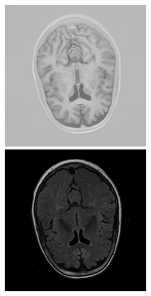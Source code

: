 \documentclass[runningheads,a4paper]{llncs}
\begin{document}
\begin{figure}
\begin{minipage}{.24\textwidth}
  \end{minipage}
  \begin{minipage}{.24\textwidth}
 \includegraphics[width=.99\linewidth]{./images/sl19-v5-test-t1-ir.png}
  \end{minipage}
  \begin{minipage}{.24\textwidth}
 \includegraphics[width=.99\linewidth]{./images/sl19-v5-test-t2-flair.png}
  \end{minipage}
  

\end{figure}
\end{document}
